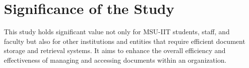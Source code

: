 \section{Significance of the Study}

This study holds significant value not only for MSU-IIT students, staff, and faculty but also for other institutions and entities that require efficient document storage and retrieval systems. It aims to enhance the overall efficiency and effectiveness of managing and accessing documents within an organization.

